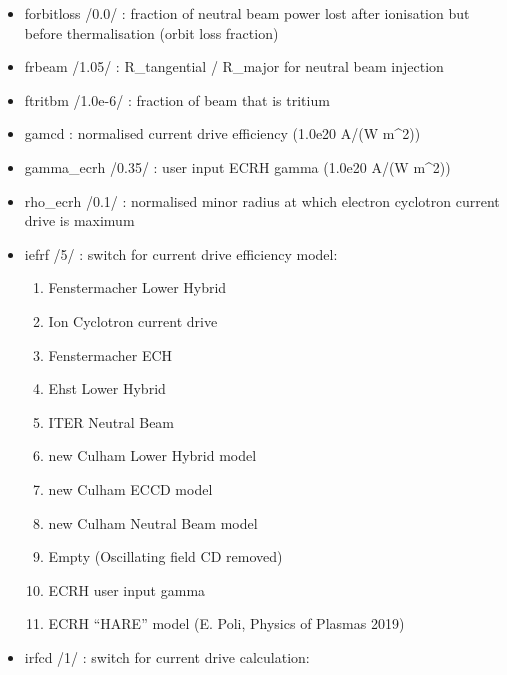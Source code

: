 \documentclass[]{article}
\providecommand{\tightlist}{%
  \setlength{\itemsep}{0pt}\setlength{\parskip}{0pt}}
\begin{document}
\begin{itemize}
\item
  forbitloss /0.0/ : fraction of neutral beam power lost after
  ionisation but before thermalisation (orbit loss fraction)
\item
  frbeam /1.05/ : R\_tangential / R\_major for neutral beam injection
\item
  ftritbm /1.0e-6/ : fraction of beam that is tritium
\item
  gamcd : normalised current drive efficiency (1.0e20 A/(W m\^{}2))
\item
  gamma\_ecrh /0.35/ : user input ECRH gamma (1.0e20 A/(W m\^{}2))
\item
  rho\_ecrh /0.1/ : normalised minor radius at which electron cyclotron
  current drive is maximum
\item
  iefrf /5/ : switch for current drive efficiency model:

  \begin{enumerate}
  \tightlist
  \item
    Fenstermacher Lower Hybrid
  \item
    Ion Cyclotron current drive
  \item
    Fenstermacher ECH
  \item
    Ehst Lower Hybrid
  \item
    ITER Neutral Beam
  \item
    new Culham Lower Hybrid model
  \item
    new Culham ECCD model
  \item
    new Culham Neutral Beam model
  \item
    Empty (Oscillating field CD removed)
  \item
    ECRH user input gamma
  \item
    ECRH ``HARE'' model (E. Poli, Physics of Plasmas 2019)
  \end{enumerate}
\item
  irfcd /1/ : switch for current drive calculation:


\end{itemize}
\end{document}
